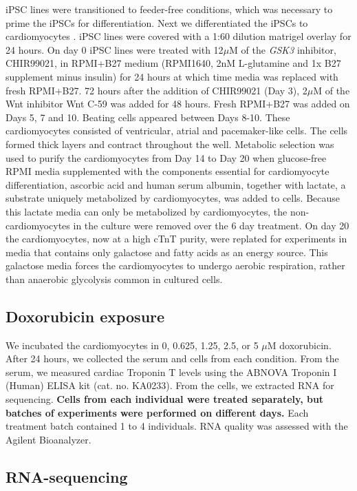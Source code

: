 \documentclass{article}
\newcommand{\tempbold}[1]{\textbf{#1}}
\begin{document}
iPSC lines were transitioned to feeder-free conditions, which was necessary to prime the iPSCs for differentiation. Next we differentiated the iPSCs to cardiomyocytes  \cite{Lian2013, Burridge2014}. iPSC lines were covered with a 1:60 dilution matrigel overlay for 24 hours. On day 0 iPSC lines were treated with 12$\mu$M of the \emph{GSK3} inhibitor, CHIR99021, in RPMI+B27 medium (RPMI1640, 2nM L-glutamine and 1x B27 supplement minus insulin) for 24 hours at which time media was replaced with fresh RPMI+B27. 72 hours after the addition of CHIR99021 (Day 3), 2$\mu$M of the Wnt inhibitor Wnt C-59 was added for 48 hours.  Fresh RPMI+B27 was added on Days 5, 7 and 10. Beating cells appeared between Days 8-10. These cardiomyocytes consisted of ventricular, atrial and pacemaker-like cells. The cells formed thick layers and contract throughout the well. Metabolic selection was used to purify the cardiomyocytes\cite{Tohyama2013-hb} from Day 14 to Day 20 when glucose-free RPMI media supplemented with the components essential for cardiomyocyte differentiation\cite{Burridge2014}, ascorbic acid and human serum albumin, together with lactate, a substrate uniquely metabolized by cardiomyocytes, was added to cells. Because this lactate media can only be metabolized by cardiomyocytes, the non-cardiomyocytes in the culture were removed over the 6 day treatment. On day 20 the cardiomyocytes, now at a high cTnT purity, were replated for experiments in media that contains only galactose and fatty acids as an energy source. This galactose media forces the cardiomyocytes to undergo aerobic respiration, rather than anaerobic glycolysis common in cultured cells.

\subsection*{Doxorubicin exposure}

We incubated the cardiomyocytes in 0, 0.625, 1.25, 2.5, or 5 $\mu$M
doxorubicin. After 24 hours, we collected the serum and cells from each
condition. From the serum, we measured cardiac Troponin T levels using the
ABNOVA Troponin I (Human) ELISA kit (cat. no. KA0233). From the cells, we
extracted RNA for sequencing. \tempbold{Cells from each individual were treated separately, but batches of experiments were performed on different days.} Each treatment batch contained 1 to 4
individuals. RNA quality was assessed with the Agilent Bioanalyzer.

\subsection*{RNA-sequencing}
\end{document}
